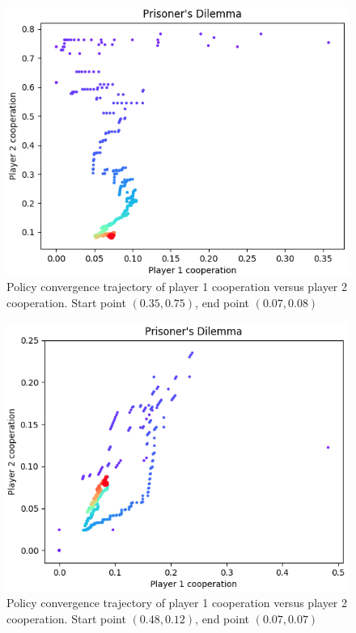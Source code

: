 \documentclass[journal]{IEEEtran}
\begin{document}
\begin{figure}[!h]
\centering
\includegraphics[scale=0.35]{figure/firstGameFirstPolicy4m.png}
\caption{Policy convergence trajectory of player 1 cooperation versus player 2 cooperation. Start point $(0.35, 0.75)$, end point $(0.07, 0.08)$}
\label{Fig:firstPolFirstGame1}
\end{figure}


\begin{figure}[!h]

\centering
\includegraphics[scale=0.35]{figure/firstGameFirstPolicy3m.png}
\caption{Policy convergence trajectory of player 1 cooperation versus player 2 cooperation.
Start point $(0.48, 0.12)$, end point $(0.07, 0.07)$}
\label{Fig:firstPolFirstGame2}
\end{figure}
\end{document}
